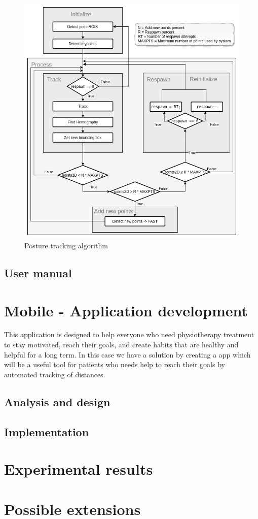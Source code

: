 \begin{figure}
	\centerline{\includegraphics[scale=0.5]{fig/posture-tracking-algorithm.jpg}}  
	\caption{Posture tracking algorithm}
\end{figure}
\subsection{User manual}


\section{Mobile - Application development}

\par This application is designed to help everyone who need physiotherapy treatment to stay motivated,
 reach their goals, and create habits that are healthy and helpful for a long term. 
 In this case we have a solution by creating a app which will be a useful tool for patients who needs help 
 to reach their goals by automated tracking of distances.
\subsection{Analysis and design}
\subsection{Implementation}
\section{Experimental results}

\section{Possible extensions}